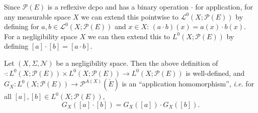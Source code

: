 \documentclass{lmcs}
\newcommand{\Ell}{\mathcal{L}}
\newcommand{\En}{\mathcal{N}}
\newcommand{\powerset}{\ensuremath{\mathcal{P}}}
\newcommand{\axpowerset}{\powerset^{A(X)}}
\begin{document}
Since $\powerset(E)$ is a reflexive dcpo and has a binary operation $\cdot$ for application, for any measurable space $X$ we can extend this pointwise to $\Ell^0(X;\powerset(E))$ by defining for $a,b \in \Ell^0(X;\powerset(E))$ and $x \in X$:
$
(a \cdot b)(x) = a(x) \cdot b(x).
$
\\For a negligibility space $X$ we can then extend this to $L^0(X;\powerset(E))$ by defining
$
[a] \cdot [b] = [a \cdot b].
$
\begin{prop}
\label{ApplicationPointwiseWellDefProp}
Let $(X,\Sigma,\En)$ be a negligibility space. Then the above definition of $\cdot : L^0(X;\powerset(E)) \times L^0(X;\powerset(E)) \rightarrow L^0(X;\powerset(E))$ is well-defined, and $G_X : L^0(X;\powerset(E)) \rightarrow \axpowerset(\check{E})$ is an ``application homomorphism'', \emph{i.e.} for all $[a],[b] \in L^0(X;\powerset(E))$,
\[
G_X([a] \cdot [b]) = G_X([a]) \cdot G_X([b]).
\]
\end{prop}
\end{document}

